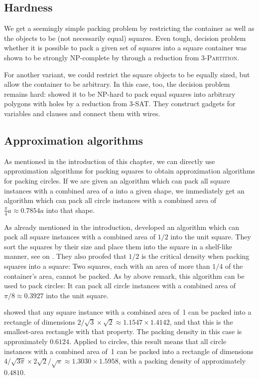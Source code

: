 \documentclass[a4paper,style=print,oneside,bibliography=totoc,nexus,lnum,extramargin]{tubsbook}
\begin{document}
\subsection{Hardness}

We get a seemingly simple packing problem by restricting the container as well as the objects to be (not necessarily equal) squares.
Even tough, decision problem whether it is possible to pack a given set of squares into a square container was shown to be strongly NP-complete by \textcite{LTWYC1990packing} through a reduction from \textsc{3-Partition}.

For another variant, we could restrict the square objects to be equally sized, but allow the container to be arbitrary.
In this case, too, the decision problem remains hard:
\textcite{FPT1981optimal} showed it to be NP-hard to pack equal squares into arbitrary polygons with holes by a reduction from \textsc{3-SAT}. They construct gadgets for variables and clauses and connect them with wires.

\subsection{Approximation algorithms}

As mentioned in the introduction of this chapter, we can directly use approximation algorithms for packing squares to obtain approximation algorithms for packing circles.
If we are given an algorithm which can pack all square instances with a combined area of $a$ into a given shape, we immediately get an algorithm which can pack all circle instances with a combined area of $\frac{\pi}{4}a \approx 0.7854a$ into that shape. 

As already mentioned in the introduction, \textcite{MM1967some} developed an algorithm which can pack all square instances with a combined area of $1/2$ into the unit square.
They sort the squares by their size and place them into the square in a shelf-like manner, see  on .
They also proofed that $1/2$ is the critical density when packing squares into a square: Two squares, each with an area of more than $1/4$ of the container's area, cannot be packed.
As by above remark, this algorithm can be used to pack circles: It can pack all circle instances with a combined area of $\pi/8 \approx 0.3927$ into the unit square.

\textcite{KK1975optimal} showed that any square instance with a combined area of~1 can be packed into a rectangle of dimensions $2/\sqrt{3} \times \sqrt{2} \approx 1.1547 \times 1.4142$, and that this is the smallest-area rectangle with that property. The packing density in this case is approximately $0.6124$. Applied to circles, this result means that all circle instances with a combined area of~1 can be packed into a rectangle of dimensions $4/\sqrt{3\pi} \times 2\sqrt{2}/\sqrt{\pi} \approx 1.3030 \times 1.5958$, with a packing density of approximately $0.4810$.
\end{document}
